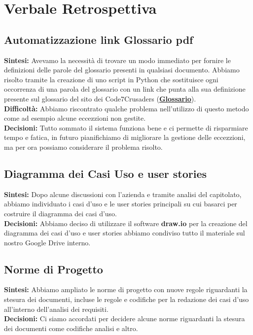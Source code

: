 \documentclass{article}
\begin{document}
\newpage
\section{Verbale Retrospettiva}

    \subsection{Automatizzazione link Glossario pdf}
    \textbf{Sintesi:} Avevamo la necessità di trovare un modo immediato per fornire le definizioni delle parole del glossario presenti in qualsiasi documento. Abbiamo risolto tramite la creazione di uno script in Python che sostituisce ogni occorrenza di una parola del glossario con un link che punta alla sua definizione presente sul glossario del sito dei Code7Crusaders (\href{https://code7crusaders.github.io/docs/RTB/documentazione_interna/glossario.html}{\textbf{Glossario}}). \\
    \textbf{Difficoltà:} Abbiamo riscontrato qualche problema nell'utilizzo di questo metodo come ad esempio alcune eccezzioni non gestite. \\
    \textbf{Decisioni:} Tutto sommato il sistema funziona bene e ci permette di risparmiare tempo e fatica, in futuro pianifichiamo di migliorare la gestione delle eccezzioni, ma per ora possiamo considerare il problema risolto. 

    \subsection{Diagramma dei Casi Uso e user stories}
    \textbf{Sintesi:} Dopo alcune discussioni con l'azienda e tramite analisi del capitolato, abbiamo individuato i casi d'uso e le user stories principali su cui basarci per costruire il diagramma dei casi d'uso. \\
    \textbf{Decisioni:} Abbiamo deciso di utilizzare il software \textbf{draw.io} per la creazione del diagramma dei casi d'uso e user stories abbiamo condiviso tutto il materiale sul nostro Google Drive interno.

    \subsection{Norme di Progetto}
    \textbf{Sintesi:} Abbiamo ampliato le norme di progetto con nuove regole riguardanti la stesura dei documenti, incluse le regole e codifiche per la redazione dei casi d'uso all'interno dell'analisi dei requisiti. \\
    \textbf{Decisioni:} Ci siamo accordati per decidere alcune norme riguardanti la stesura dei documenti come codifiche analisi e altro.
    
\end{document}
